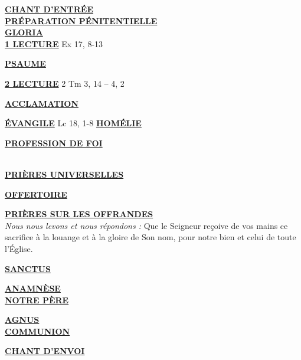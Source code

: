 \documentclass[french,11pt]{article}
\newcommand*{\chants}{../chants}
\newcommand*{\messe}{../messe_grace}
\newcommand*{\pu}{../pu}
\newcommand*{\psaumes}{../psaumes}
\newcommand{\NewsItem}[1]{%
\vspace{3pt}
\underline{\textbf{#1}}
		  }
\begin{document}
\NewsItem{CHANT D'ENTRÉE}\\
	

\NewsItem{PRÉPARATION PÉNITENTIELLE}\\
	

\NewsItem{GLORIA}\\
	


\NewsItem{1\iere{} LECTURE} Ex 17, 8-13

\NewsItem{PSAUME}


\NewsItem{2\ieme{} LECTURE} 2 Tm 3, 14 – 4, 2

\NewsItem{ACCLAMATION}


\NewsItem{ÉVANGILE} Lc 18, 1-8
\hfill
\NewsItem{HOMÉLIE}

\NewsItem{PROFESSION DE FOI}
\\ 


\NewsItem{PRIÈRES UNIVERSELLES}

%

\NewsItem{OFFERTOIRE}

\NewsItem{PRIÈRES SUR LES OFFRANDES}\\
\textit{Nous nous levons et nous répondons : }
Que le Seigneur reçoive de vos mains ce sacrifice à la louange et à la gloire
de Son nom, pour notre bien et celui de toute l’Église.


\NewsItem{SANCTUS}


\NewsItem{ANAMNÈSE}\\


\NewsItem{NOTRE PÈRE}

\NewsItem{AGNUS} \\


\NewsItem{COMMUNION}%




\NewsItem{CHANT D'ENVOI}


\newpage

\end{document}
